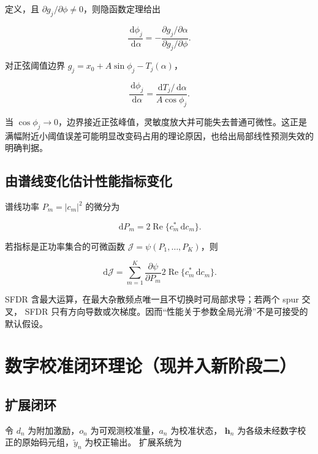 \documentclass[11pt,a4paper]{ctexart}
\newcommand{\dd}{\,\mathrm{d}}
\theoremstyle{adcplain}
\theoremstyle{definition}
\begin{document}
定义，且 $\partial g_j/\partial\phi\ne0$，则隐函数定理给出

\begin{equation}
  \frac{\dd\phi_j}{\dd\alpha}
  =
  -\frac{\partial g_j/\partial\alpha}
         {\partial g_j/\partial\phi}.
  \label{eq:boundary-derivative}
\end{equation}

对正弦阈值边界
$g_j=x_0+A\sin\phi_j-T_j(\alpha)$，

\begin{equation}
  \frac{\dd\phi_j}{\dd\alpha}
  =
  \frac{\dd T_j/\dd\alpha}
       {A\cos\phi_j}.
  \label{eq:sine-boundary-derivative}
\end{equation}

当 $\cos\phi_j\to0$，边界接近正弦峰值，灵敏度放大并可能失去普通可微性。这正是
满幅附近小阈值误差可能明显改变码占用的理论原因，也给出局部线性预测失效的
明确判据。

\subsection{由谱线变化估计性能指标变化}

谱线功率 $P_m=|c_m|^2$ 的微分为

\begin{equation}
  \dd P_m
  =
  2\operatorname{Re}\{c_m^\ast\dd c_m\}.
  \label{eq:line-power-differential}
\end{equation}

若指标是正功率集合的可微函数
$\mathcal J=\psi(P_1,\ldots,P_K)$，则

\begin{equation}
  \dd\mathcal J
  =
  \sum_{m=1}^{K}
  \frac{\partial\psi}{\partial P_m}
  2\operatorname{Re}\{c_m^\ast\dd c_m\}.
  \label{eq:metric-differential}
\end{equation}

SFDR 含最大运算，在最大杂散频点唯一且不切换时可局部求导；若两个 spur 交叉，
SFDR 只有方向导数或次梯度。因而“性能关于参数全局光滑”不是可接受的默认假设。

\section{数字校准闭环理论（现并入新阶段二）}

\subsection{扩展闭环}

令 $d_n$ 为附加激励，$o_n$ 为可观测校准量，$a_n$ 为校准状态，
$\mathbf h_n$ 为各级未经数字校正的原始码元组，$\widetilde y_n$ 为校正输出。
扩展系统为
\end{document}
